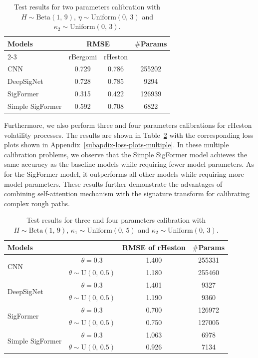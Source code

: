 \documentclass[]{article}
\renewcommand{\(}{\left(}
\renewcommand{\)}{\right)}
\begin{document}
	\begin{table}[H]
		\caption{Test results for two parameters calibration with $H\sim\text{Beta}(1,\,9)$, $\eta\sim\text{Uniform}(0,\,3)$ and $\kappa_2\sim\text{Uniform}(0,\,3)$.}
		\label{tab-multiple-two}
		\smallskip
		\centering
		\renewcommand\arraystretch{1.5}
		\begin{tabular}{l c c c}
				\toprule
				\multirow{2}{*}{Models}&\multicolumn{2}{c}{RMSE}&\multirow{2}{*}{$\#$Params}\\
				\cline{2-3}
				&rBergomi&rHeston&\\
				\hline
				CNN&0.729&0.786&255202\\
				\hline
				DeepSigNet&0.728&0.785&9294\\
				\hline
				SigFormer&0.315&0.422&126939\\
				\hline
				Simple SigFormer&0.592&0.708&6822\\
				\bottomrule
		\end{tabular}
	\end{table}
	
	Furthermore, we also perform three and four parameters calibrations for rHeston volatility processes. The results are shown in Table~\ref{tab-multiple-threefour} with the corresponding loss plots shown in Appendix~\ref{subapdix-loss-plots-multiple}. In these multiple calibration problems, we observe that the Simple SigFormer model achieves the same accuracy as the baseline models while requiring fewer model parameters. As for the SigFormer model, it outperforms all other models while requiring more model parameters. These results further demonstrate the advantages of combining self-attention mechanism with the signature transform for calibrating complex rough paths.
	
	\begin{table}[H]
		\caption{Test results for three and four parameters calibration with $H\sim\text{Beta}(1,\,9)$, $\kappa_1\sim\text{Uniform}(0,\,5)$ and $\kappa_2\sim\text{Uniform}(0,\,3)$.}
		\label{tab-multiple-threefour}
		\smallskip
		\centering
		\renewcommand\arraystretch{1.5}
		\begin{tabular}{l c c c}
			\toprule
			Models&&RMSE of rHeston&$\#$Params\\
			\hline
			\multirow{2}{*}{CNN}&$\theta=0.3$&1.400&255331\\
			&$\theta\sim\text{U}(0,\,0.5)$&1.180&255460\\
			\hline
			\multirow{2}{*}{DeepSigNet}&$\theta=0.3$&1.401&9327\\
			&$\theta\sim\text{U}(0,\,0.5)$&1.190&9360\\
			\hline
			\multirow{2}{*}{SigFormer}&$\theta=0.3$&0.700&126972\\
			&$\theta\sim\text{U}(0,\,0.5)$&0.750&127005\\
			\hline
			\multirow{2}{*}{Simple SigFormer}&$\theta=0.3$&1.063&6978\\
			&$\theta\sim\text{U}(0,\,0.5)$&0.926&7134\\
			\bottomrule
		\end{tabular}
	\end{table}
	
\end{document}
